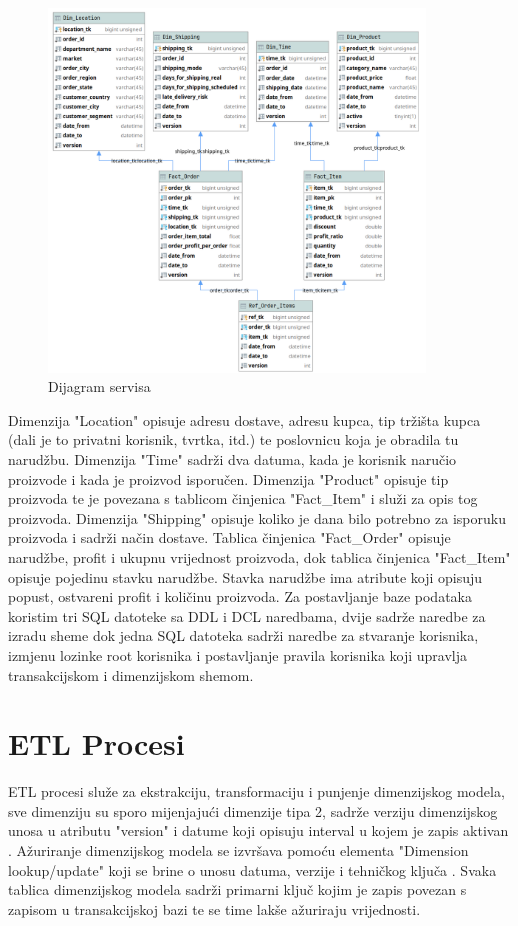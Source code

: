 \documentclass[12pt, oneside]{book}
\begin{document}
\begin{figure}[h]
\includegraphics[width=10cm]{images/i02_data_co_schema_dim.png}
\centering
\caption{Dijagram servisa}
\end{figure}

Dimenzija "Location" opisuje adresu dostave, adresu kupca, tip tržišta kupca (dali je to privatni korisnik, tvrtka, itd.) te poslovnicu koja je obradila tu narudžbu. Dimenzija "Time" sadrži dva datuma, kada je korisnik naručio proizvode i kada je proizvod isporučen. Dimenzija "Product" opisuje tip proizvoda te je povezana s tablicom činjenica "Fact\_Item" i služi za opis tog proizvoda. Dimenzija "Shipping" opisuje koliko je dana bilo potrebno za isporuku proizvoda i sadrži način dostave. Tablica činjenica "Fact\_Order" opisuje narudžbe, profit i ukupnu vrijednost proizvoda, dok tablica činjenica "Fact\_Item" opisuje pojedinu stavku narudžbe. Stavka narudžbe ima atribute koji opisuju popust, ostvareni profit i količinu proizvoda. Za postavljanje baze podataka koristim tri SQL datoteke sa DDL i DCL naredbama, dvije sadrže naredbe za izradu sheme dok jedna SQL datoteka sadrži naredbe za stvaranje korisnika, izmjenu lozinke root korisnika i postavljanje pravila korisnika koji upravlja transakcijskom i dimenzijskom shemom.



\chapter{ETL Procesi}
\label{Cetl}
ETL procesi služe za ekstrakciju, transformaciju i punjenje dimenzijskog modela, sve dimenziju su sporo mijenjajući dimenzije tipa 2, sadrže verziju dimenzijskog unosa u atributu "version" i datume koji opisuju interval u kojem je zapis aktivan . Ažuriranje dimenzijskog modela se izvršava pomoću elementa "Dimension lookup/update" koji se brine o unosu datuma, verzije i tehničkog ključa \cite{pentaho}. Svaka tablica dimenzijskog modela sadrži primarni ključ kojim je zapis povezan s zapisom u transakcijskoj bazi te se time lakše ažuriraju vrijednosti.
\end{document}
